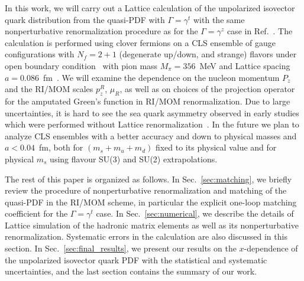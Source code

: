 In this work, we will carry out a Lattice calculation of the unpolarized isovector quark distribution from the quasi-PDF with $\Gamma=\gamma^t$ with the same nonperturbative renormalization procedure as  for the $\Gamma=\gamma^z$ case in Ref.~\cite{Chen:2017mzz}.  The calculation is performed using clover fermions on a CLS ensemble of gauge configurations with $N_f=2+1$ (degenerate up/down, and strange) flavors under   open boundary condition~\cite{Luscher:2011kk} with pion mass $M_{\pi}=356$~MeV and Lattice spacing $a=0.086$~fm~\cite{Bruno:2014jqa}.  We will  examine the dependence on the nucleon momentum $P_z$ and the RI/MOM scales $p_z^R$, $\mu_R$, as well as on   choices of the projection operator for the amputated Green's function in RI/MOM renormalization.
Due to large uncertainties, it is hard  to see the sea quark asymmetry observed in early studies which were performed without Lattice renormalization~\cite{Lin:2014zya,Alexandrou:2015rja,Chen:2016utp,Alexandrou:2016jqi}.  In the future we plan to analyze CLS ensembles with a better accuracy and  down to physical masses and $a<0.04$~fm, both for $(m_s+m_u+m_d)$ fixed to its physical value and for physical $m_s$ using flavour SU(3) and SU(2) extrapolations.

The rest of this paper is organized as follows.  In Sec.~\ref{sec:matching}, we briefly  review the procedure of nonperturbative renormalization and matching of the quasi-PDF in the RI/MOM scheme, in particular  the explicit one-loop matching coefficient for the $\Gamma=\gamma^t$ case. In Sec.~\ref{sec:numerical}, we describe the details of Lattice simulation of the hadronic matrix elements as well as its nonperturbative renormalization. Systematic errors in the calculation are also discussed in this section. In Sec.~\ref{sec:final_results}, we present our   results on the $x$-dependence of the unpolarized isovector quark PDF with the statistical and systematic uncertainties, and the last section contains the summary of  our work.


